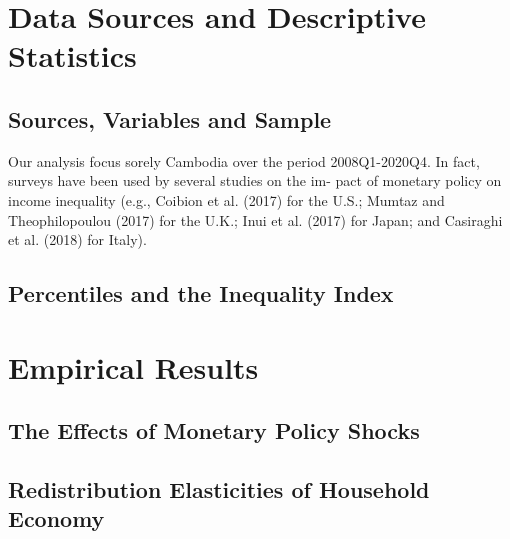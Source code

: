 \documentclass[11pt,letterpaper]{article}
\begin{document}
\section{Data Sources and Descriptive Statistics}\label{sec:data}
\subsection{Sources, Variables and Sample}	
Our analysis focus sorely Cambodia over the period 2008Q1-2020Q4. In fact, surveys have been used by several studies on the im- pact of monetary policy on income inequality (e.g., Coibion et al. (2017) for the U.S.; Mumtaz and Theophilopoulou (2017) for the U.K.; Inui et al. (2017) for Japan; and Casiraghi et al. (2018) for Italy).
\subsection{Percentiles and the Inequality Index}	

\section{Empirical Results}\label{sec:results}

\subsection{The Effects of Monetary Policy Shocks}

\subsection{Redistribution Elasticities of Household Economy}

\end{document}
